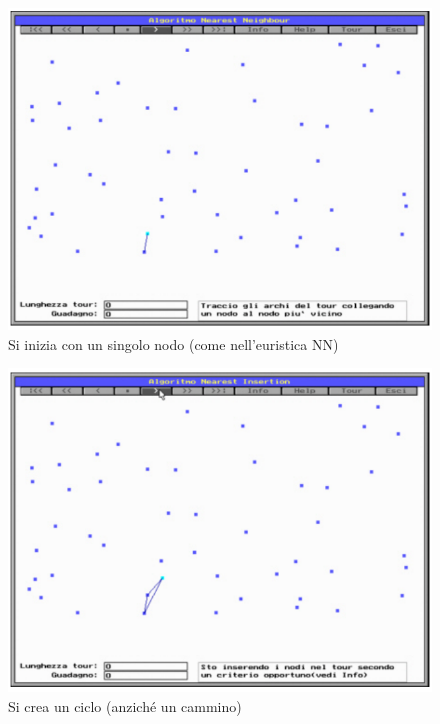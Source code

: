 \documentclass{article}
\begin{document}
\begin{figure}[H]
    \centering
    \includegraphics[scale=0.5]{images/cheap_ins0.png}
    \caption{Si inizia con un singolo nodo (come nell'euristica NN)}
\end{figure}

\begin{figure}[H]
    \centering
    \includegraphics[scale=0.5]{images/cheap_ins1.png}
    \caption{Si crea un ciclo (anziché un cammino)}
\end{figure}
\end{document}
